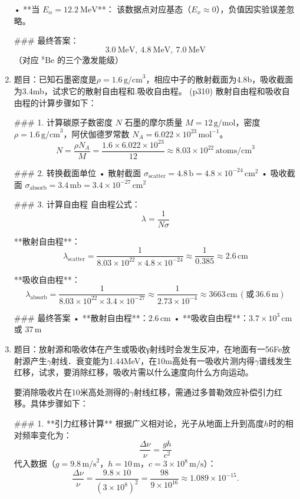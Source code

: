 \documentclass{article}
\begin{document}
\begin{enumerate}
• **当 \(E_\alpha = 12.2\ \text{MeV}\)**：  
  该数据点对应基态（\(E_x \approx 0\)），负值因实验误差忽略。

### 最终答案：
\[
\boxed{3.0\ \text{MeV},\ 4.8\ \text{MeV},\ 7.0\ \text{MeV}}
\]  
（对应 \(^{8}\text{Be}\) 的三个激发能级）

\item 
题目：已知石墨密度是\( \rho = 1.6 \, \text{g/cm}^3 \)，相应中子的散射截面为4.8b，吸收截面为3.4mb，试求它的散射自由程和.吸收自由程。   (p310)
散射自由程和吸收自由程的计算步骤如下：

### 1. 计算碳原子数密度 \( N \)
石墨的摩尔质量 \( M = 12 \, \text{g/mol} \)，密度 \( \rho = 1.6 \, \text{g/cm}^3 \)，阿伏伽德罗常数 \( N_A = 6.022 \times 10^{23} \, \text{mol}^{-1} \)。  
\[
N = \frac{\rho N_A}{M} = \frac{1.6 \times 6.022 \times 10^{23}}{12} \approx 8.03 \times 10^{22} \, \text{atoms/cm}^3
\]

### 2. 转换截面单位
• 散射截面 \( \sigma_{\text{scatter}} = 4.8 \, \text{b} = 4.8 \times 10^{-24} \, \text{cm}^2 \)
• 吸收截面 \( \sigma_{\text{absorb}} = 3.4 \, \text{mb} = 3.4 \times 10^{-27} \, \text{cm}^2 \)

### 3. 计算自由程
自由程公式：  
\[
\lambda = \frac{1}{N \sigma}
\]

**散射自由程**：  
\[
\lambda_{\text{scatter}} = \frac{1}{8.03 \times 10^{22} \times 4.8 \times 10^{-24}} \approx \frac{1}{0.385} \approx 2.6 \, \text{cm}
\]

**吸收自由程**：  
\[
\lambda_{\text{absorb}} = \frac{1}{8.03 \times 10^{22} \times 3.4 \times 10^{-27}} \approx \frac{1}{2.73 \times 10^{-4}} \approx 3663 \, \text{cm} \, (\text{或} \, 36.6 \, \text{m})
\]

### 最终答案
• **散射自由程**：\(\boxed{2.6 \, \text{cm}}\)  
• **吸收自由程**：\(\boxed{3.7 \times 10^3 \, \text{cm}}\) 或 \(\boxed{37 \, \text{m}}\)

\item 
题目：放射源和吸收体在产生或吸收γ射线时会发生反冲，在地面有一56Fe放射源产生$\gamma$射线．衰变能为1.44MeV，在10m高处有一吸收片测内得$\gamma$谱线发生红移，试求，要消除红移，吸收片需以什么速度向什么方向运动。

要消除吸收片在10米高处测得的$\gamma$射线红移，需通过多普勒效应补偿引力红移。具体步骤如下：

### 1. **引力红移计算**
根据广义相对论，光子从地面上升到高度\( h \)时的相对频率变化为：
\[
\frac{\Delta \nu}{\nu} = \frac{gh}{c^2}
\]
代入数据（\( g = 9.8 \, \text{m/s}^2 \)，\( h = 10 \, \text{m} \)，\( c = 3 \times 10^8 \, \text{m/s} \)）：
\[
\frac{\Delta \nu}{\nu} = \frac{9.8 \times 10}{(3 \times 10^8)^2} = \frac{98}{9 \times 10^{16}} \approx 1.089 \times 10^{-15}.
\]


\end{enumerate}
\end{document}
